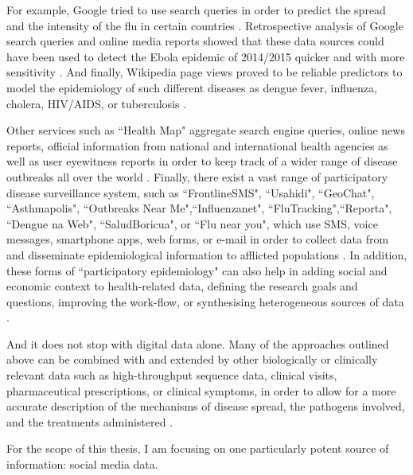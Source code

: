 \documentclass[11pt, a4paper,twoside]{report}\usepackage[]{graphicx}\usepackage[]{color}
\begin{document}
For example, Google tried to use search queries in order to predict the spread and the intensity of the flu in certain countries \citep{ginsberg_detecting_2009}. Retrospective analysis of Google search queries and online media reports showed that these data sources could have been used to detect the Ebola epidemic of 2014/2015 quicker and with more sensitivity \citep{anema_digital_2014, milinovich_role_2015}. And finally, Wikipedia page views proved to be reliable predictors to model the epidemiology of such different diseases as dengue fever, influenza, cholera, HIV/AIDS, or tuberculosis \citep{generous_global_2014}. 

Other services such as ``Health Map" aggregate search engine queries, online news reports, official information from national and international health agencies as well as user eyewitness reports in order to keep track of a wider range of disease outbreaks all over the world \citep{brownstein_surveillance_2008,freifeld_healthmap:_2008}. Finally, there exist a vast range of participatory disease surveillance system, such as ``FrontlineSMS", ``Usahidi", ``GeoChat", ``Asthmapolis", ``Outbreaks Near Me",``Influenzanet", ``FluTracking",``Reporta", ``Dengue na Web", ``SaludBoricua", or ``Flu near you", which use SMS, voice messages, smartphone apps, web forms, or e-mail in order to collect data from and disseminate epidemiological information to afflicted populations \citep{freifeld_participatory_2010,chunara_flu_2013,wojcik_public_2014,chunara_estimating_2015}. In addition, these forms of ``participatory epidemiology" can also help in adding social and economic context to health-related data, defining the research goals and questions, improving the work-flow, or synthesising heterogeneous sources of data \citep{bach_participatory_2017,liu_assessing_2017}.

And it does not stop with digital data alone. Many of the approaches outlined above can be combined with and extended by other biologically or clinically relevant data such as high-throughput sequence data, clinical visits, pharmaceutical prescriptions, or clinical symptoms, in order to allow for a more accurate description of the mechanisms of disease spread, the pathogens involved, and the treatments administered \citep{ray_network_2016}.

For the scope of this thesis, I am focusing on one particularly potent source of information: social media data.
\end{document}
